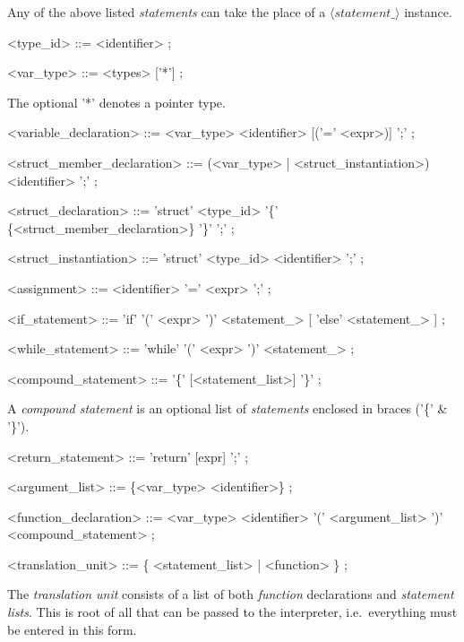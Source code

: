 \documentclass{article}
\begin{document}
Any of the above listed \textit{statements} can take the place of a $\langle statement\_\rangle$ instance.
\begin{grammar}
<type_id> ::= <identifier> ;
\end{grammar}
\begin{grammar}
<var_type> ::= <types> ['*'] ;
\end{grammar}
The optional '*' denotes a pointer type.
\begin{grammar}
<variable_declaration> ::=
	<var_type> <identifier> [('=' <expr>)] ';' ;
\end{grammar}
\begin{grammar}
<struct_member_declaration> ::=
	(<var_type> | <struct_instantiation>) <identifier> ';' ;
\end{grammar}
\begin{grammar}
<struct_declaration> ::=
	'struct' <type_id>
    '\{'
    \{<struct_member_declaration>\}
    '\}'
    ';'
    ;
\end{grammar}
\begin{grammar}
<struct_instantiation> ::=
	'struct'
    <type_id>
    <identifier>
    ';'
    ;
\end{grammar}
\begin{grammar}
<assignment> ::=
	<identifier>
       '='
       <expr>
       ';'
    ;
\end{grammar}
\begin{grammar}
<if_statement> ::=
	'if'
       '('
       <expr>
       ')'
       <statement_>
	[
	    'else'
	   <statement_>
	]
    ;
\end{grammar}
\begin{grammar}
<while_statement> ::=
	'while'
       '('
       <expr>
       ')'
       <statement_>
    ;
\end{grammar}
\begin{grammar}
<compound_statement> ::=
    '\{' [<statement_list>] '\}'
    ;
\end{grammar}
A \textit{compound statement} is an optional list of \textit{statements} enclosed in braces ('\{' \& '\}').
\begin{grammar}
<return_statement> ::=
	'return'
    [expr]
       ';'
    ;
\end{grammar}
\begin{grammar}
<argument_list> ::= \{<var_type> <identifier>\} ;
\end{grammar}
\begin{grammar}
<function_declaration> ::=
	<var_type>
       <identifier>
       '(' <argument_list> ')'
       <compound_statement>
    ;
\end{grammar}
\begin{grammar}
<translation_unit> ::=
    \{ <statement_list> | <function> \} ;
\end{grammar}
The \textit{translation unit} consists of a list of both \textit{function} declarations and \textit{statement lists}. This is root of all that can be passed to the interpreter, i.e.\ everything must be entered in this form.
\end{document}
